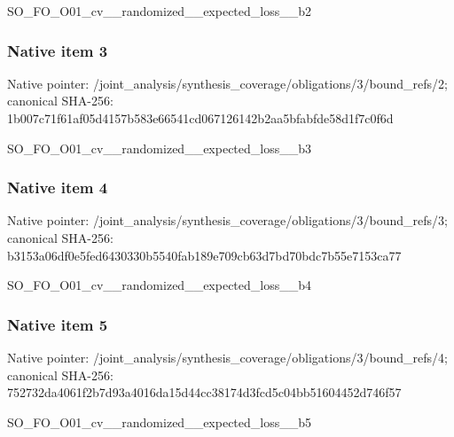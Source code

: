 \documentclass[10pt,a4paper]{article}
\begin{document}
\begingroup\raggedright\sloppy SO\_\allowbreak{}FO\_\allowbreak{}O01\_\allowbreak{}cv\_\allowbreak{}\_\allowbreak{}randomized\_\allowbreak{}\_\allowbreak{}expected\_\allowbreak{}loss\_\allowbreak{}\_\allowbreak{}b2\par\endgroup

\subsubsection{Native item 3}
Native pointer: /joint\_\allowbreak{}analysis/synthesis\_\allowbreak{}coverage/obligations/3/bound\_\allowbreak{}refs/2; canonical SHA-256: 1b007c71f61af05d4157b583e66541cd067126142b2aa5bfabfde58d1f7c0f6d

\begingroup\raggedright\sloppy SO\_\allowbreak{}FO\_\allowbreak{}O01\_\allowbreak{}cv\_\allowbreak{}\_\allowbreak{}randomized\_\allowbreak{}\_\allowbreak{}expected\_\allowbreak{}loss\_\allowbreak{}\_\allowbreak{}b3\par\endgroup

\subsubsection{Native item 4}
Native pointer: /joint\_\allowbreak{}analysis/synthesis\_\allowbreak{}coverage/obligations/3/bound\_\allowbreak{}refs/3; canonical SHA-256: b3153a06df0e5fed6430330b5540fab189e709cb63d7bd70bdc7b55e7153ca77

\begingroup\raggedright\sloppy SO\_\allowbreak{}FO\_\allowbreak{}O01\_\allowbreak{}cv\_\allowbreak{}\_\allowbreak{}randomized\_\allowbreak{}\_\allowbreak{}expected\_\allowbreak{}loss\_\allowbreak{}\_\allowbreak{}b4\par\endgroup

\subsubsection{Native item 5}
Native pointer: /joint\_\allowbreak{}analysis/synthesis\_\allowbreak{}coverage/obligations/3/bound\_\allowbreak{}refs/4; canonical SHA-256: 752732da4061f2b7d93a4016da15d44cc38174d3fcd5c04bb51604452d746f57

\begingroup\raggedright\sloppy SO\_\allowbreak{}FO\_\allowbreak{}O01\_\allowbreak{}cv\_\allowbreak{}\_\allowbreak{}randomized\_\allowbreak{}\_\allowbreak{}expected\_\allowbreak{}loss\_\allowbreak{}\_\allowbreak{}b5\par\endgroup
\end{document}
